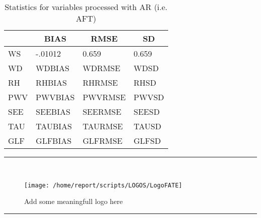 \documentclass[11pt,english]{article}
\newcommand{\HRule}{\rule{\linewidth}{0.5mm}}
\begin{document}
\begin{table}[]
\begin{center}
\begin{tabular}{|l|l|l|l|}
\hline
                            & \multicolumn{1}{c|}{\cellcolor[HTML]{C0C0C0}\textbf{BIAS}} & \multicolumn{1}{c|}{\cellcolor[HTML]{C0C0C0}\textbf{RMSE}} & \multicolumn{1}{c|}{\cellcolor[HTML]{C0C0C0}\textbf{SD}} \\\hline
\cellcolor[HTML]{C0C0C0}WS  &   -.01012                                &     0.659                                &     0.659                                \\
\cellcolor[HTML]{C0C0C0}WD  & WDBIAS                                & WDRMSE                                & WDSD                                \\
\cellcolor[HTML]{C0C0C0}RH  & RHBIAS                                & RHRMSE                                & RHSD                                \\
\cellcolor[HTML]{C0C0C0}PWV & PWVBIAS                               & PWVRMSE                               & PWVSD                               \\
\cellcolor[HTML]{C0C0C0}SEE & SEEBIAS                               & SEERMSE                               & SEESD                               \\
\cellcolor[HTML]{C0C0C0}TAU & TAUBIAS                               & TAURMSE                               & TAUSD                               \\
\cellcolor[HTML]{C0C0C0}GLF & GLFBIAS                               & GLFRMSE                               & GLFSD                               \\
\hline
\end{tabular}
\caption{Statistics for variables processed with AR (i.e. AFT)}
\end{center}
\end{table}

\clearpage

\begin{center}
\HRule \\[0.4cm]
\begin{figure}[htbp]
\centering
{\texttt{[image: /home/report/scripts/LOGOS/LogoFATE]}}
\caption{Add some meaningfull logo here}
\end{figure}
\HRule \\[0.4cm]
\end{center}
\end{document}
